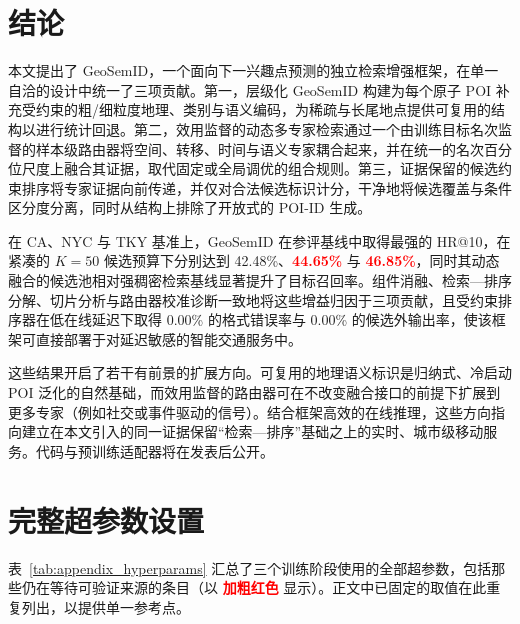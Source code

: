 \documentclass[10pt,fontset=none,twocolumn]{ctexart}
\newcommand{\mock}[1]{\textbf{\textcolor{red}{#1}}}
\begin{document}
\section{结论}
\label{sec:conclusion}

本文提出了 GeoSemID，一个面向下一兴趣点预测的独立检索增强框架，在单一自洽的设计中统一了三项贡献。第一，层级化 GeoSemID 构建为每个原子 POI 补充受约束的粗/细粒度地理、类别与语义编码，为稀疏与长尾地点提供可复用的结构以进行统计回退。第二，效用监督的动态多专家检索通过一个由训练目标名次监督的样本级路由器将空间、转移、时间与语义专家耦合起来，并在统一的名次百分位尺度上融合其证据，取代固定或全局调优的组合规则。第三，证据保留的候选约束排序将专家证据向前传递，并仅对合法候选标识计分，干净地将候选覆盖与条件区分度分离，同时从结构上排除了开放式的 POI-ID 生成。

在 CA、NYC 与 TKY 基准上，GeoSemID 在参评基线中取得最强的 HR@10，在紧凑的 $K=50$ 候选预算下分别达到 42.48\%、\mock{44.65\%} 与
\mock{46.85\%}，同时其动态融合的候选池相对强稠密检索基线显著提升了目标召回率。组件消融、检索—排序分解、切片分析与路由器校准诊断一致地将这些增益归因于三项贡献，且受约束排序器在低在线延迟下取得 0.00\% 的格式错误率与 0.00\% 的候选外输出率，使该框架可直接部署于对延迟敏感的智能交通服务中。

这些结果开启了若干有前景的扩展方向。可复用的地理语义标识是归纳式、冷启动 POI 泛化的自然基础，而效用监督的路由器可在不改变融合接口的前提下扩展到更多专家（例如社交或事件驱动的信号）。结合框架高效的在线推理，这些方向指向建立在本文引入的同一证据保留“检索—排序”基础之上的实时、城市级移动服务。代码与预训练适配器将在发表后公开。

\appendix

\section{完整超参数设置}
\label{app:hyperparams}

表~\ref{tab:appendix_hyperparams} 汇总了三个训练阶段使用的全部超参数，包括那些仍在等待可验证来源的条目（以 \mock{加粗红色} 显示）。正文中已固定的取值在此重复列出，以提供单一参考点。
\end{document}
